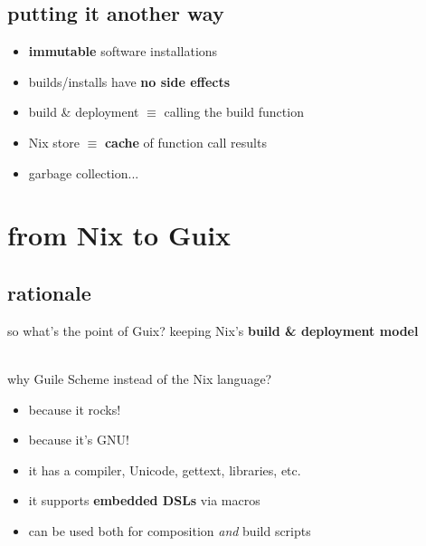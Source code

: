 \documentclass{beamer}
\begin{document}
\subsection{putting it another way}

\begin{frame}
  \vspace{1cm}

  \vspace{1cm}
  \begin{itemize}
    \item<2-> \alert{\bf immutable} software installations
    \item<3-> builds/installs have \alert{\bf no side effects}
    \item<4-> build \& deployment $\equiv$ calling the build function
    \item<4-> Nix store $\equiv$ \alert{\bf cache} of function call results
    \item<5-> garbage collection...
  \end{itemize}
\end{frame}

\section{from Nix to Guix}

\subsection{rationale}

\begin{frame}{so what's the point of Guix?}
  \huge{keeping Nix's \textbf{build \& deployment model}\\[3.5mm]
    \\[3.5mm]
    }
\end{frame}

\begin{frame}{why Guile Scheme instead of the Nix language?}
  \begin{itemize}
  \item<1-> because it rocks!
  \item<2-> because it's GNU!
  \item<3-> it has a compiler, Unicode, gettext, libraries, etc.
  \item<4-> it supports \textbf{embedded DSLs} via macros
  \item<5-> can be used both for composition \emph{and} build scripts
  \end{itemize}
\end{frame}
\end{document}
